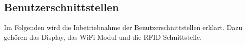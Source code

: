 \newpage
\subsection{Benutzerschnittstellen}
\label{sec:Inbetriebnahme_Benutzerschnittstellen}

Im Folgenden wird die Inbetriebnahme der Benutzerschnittstellen erklärt. Dazu gehören das Display, das WiFi-Modul und die RFID-Schnittstelle.

